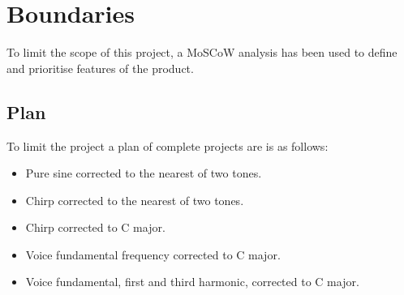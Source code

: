 
\chapter{Boundaries}
\label{sec:Boundaries}
To limit the scope of this project, a MoSCoW analysis has been used to define and prioritise features of the product.

\section{Plan}
To limit the project a plan of complete projects are is as follows:

\begin{itemize}
	\item Pure sine corrected to the nearest of two tones.
	\item Chirp corrected to the nearest of two tones.
	\item Chirp corrected to C major.
	\item Voice fundamental frequency corrected to C major.
	\item Voice fundamental, first and third harmonic, corrected to C major.
\end{itemize}